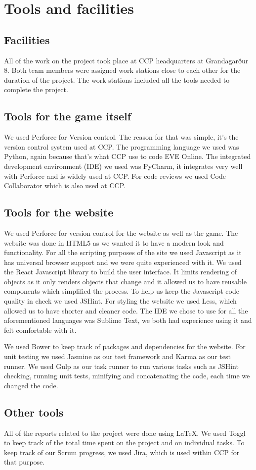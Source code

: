 \section{Tools and facilities}\label{tools}

\subsection{Facilities}
All of the work on the project took place at CCP headquarters at Grandagarður 8. Both team members were assigned work stations close to each other for the duration of the project. The work stations included all the tools needed to complete the project. 

\subsection{Tools for the game itself}
We used Perforce for Version control. The reason for that was simple, it's the version control system used at CCP. The programming language we used was Python, again because that's what CCP use to code EVE Online. The integrated development environment (IDE) we used was PyCharm, it integrates very well with Perforce and is widely used at CCP. For code reviews we used Code Collaborator which is also used at CCP.

\subsection{Tools for the website}
We used Perforce for version control for the website as well as the game. The website was done in HTML5 as we wanted it to have a modern look and functionality. For all the scripting purposes of the site we used Javascript as it has universal browser support and we were quite experienced with it. We used the React Javascript library to build the user interface. It limits rendering of objects as it only renders objects that change and it allowed us to have reusable components which simplified the process. To help us keep the Javascript code quality in check we used JSHint. For styling the website we used Less, which allowed us to have shorter and cleaner code. The IDE we chose to use for all the aforementioned languages was Sublime Text, we both had experience using it and felt comfortable with it. 

We used Bower to keep track of packages and dependencies for the website. For unit testing we used Jasmine as our test framework and Karma as our test runner. We used Gulp as our task runner to run various tasks such as JSHint checking, running unit tests, minifying and concatenating the code, each time we changed the code.

\subsection{Other tools}

All of the reports related to the project were done using \LaTeX. We used Toggl to keep track of the total time spent on the project and on individual tasks. To keep track of our Scrum progress, we used Jira, which is used within CCP for that purpose.
